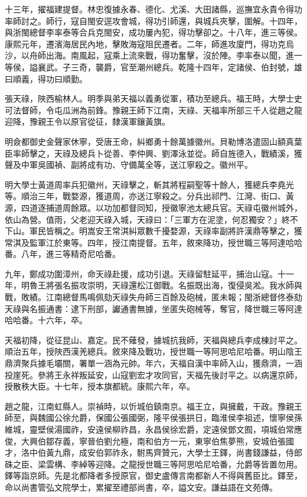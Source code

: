 \begin{pinyinscope}
十三年，擢福建提督。林忠復據永春、德化、尤溪、大田諸縣，巡撫宜永貴令得功率師討之。師行，寇自閩安逕攻會城，得功引師還，與城兵夾擊，圍解。十四年，與浙閩總督李率泰等合兵克閩安，成功屢內犯，得功擊卻之。十八年，進三等侯。康熙元年，遷濱海居民內地，擊敗海寇阻民遷者。二年，師進攻廈門，得功克烏沙，以舟師出海。南風起，寇乘上流來戰，得功奮擊，沒於陣。李率泰以聞，進一等侯，謚襄武。子三奇，襲爵，官至潮州總兵。乾隆十四年，定諸侯、伯封號，雄曰順義，得功曰順勤。

張天祿，陜西榆林人。明季與弟天福以義勇從軍，積功至總兵。福王時，大學士史可法督師，令屯瓜洲為前鋒。豫親王師下江南，天祿、天福率所部三千人從趙之龍迎降，豫親王令以原官從征，隸漢軍鑲黃旗。

明僉都御史金聲家休寧，受唐王命，糾鄉勇十餘萬據徽州。貝勒博洛遣固山額真葉臣率師擊之，天祿及總兵卜從善、李仲興、劉澤泳並從。師自旌德入，戰績溪，獲聲及中軍吳國禎、副將成有功、守備萬全等，送江寧殺之。徽州平。

明大學士黃道周率兵犯徽州，天祿擊之，斬其將程嗣聖等十餘人，獲總兵李堯光等。順治三年，戰婺源，獲道周，亦送江寧殺之。分兵出祁門、江灣、街口、黃源，四道逐捕道周餘眾。以功加都督同知，授徽寧池太總兵官。天祿屯徽州城外，依山為營。值雨，父老迎天祿入城，天祿曰：「三軍方在泥塗，何忍獨安？」終不下山。軍民皆稱之。明嵩安王常淇糾眾數千擾婺源，天祿率副將許漢鼎等擊之，獲常淇及監軍江於東等。四年，授江南提督。五年，敘來降功，授世職三等阿達哈哈番。八年，進三等精奇尼哈番。

九年，鄭成功圍漳州，命天祿赴援，成功引退。天祿留駐延平，捕治山寇。十一年，明魯王將張名振攻崇明，天祿還松江御戰。名振既出海，復侵吳淞。我水師與戰，敗績。江南總督馬鳴佩劾天祿失舟師三百餘及砲械，匿未報；閩浙總督佟泰劾天祿與名振通書：逮下刑部，讞通書無據，坐匿失砲械等，奪官，降世職三等阿達哈哈番。十六年，卒。

天福初降，從征昆山、嘉定。民不薙發，據城抗我師，天福與總兵李成棟討平之。順治五年，授陜西漢羌總兵。敘來降及戰功，授世職一等阿思哈尼哈番。明山陰王鼎濟聚兵據毛壩關，署單一涵為元帥。年六，天福自漢中率師入山，獲鼎濟，一涵投崖死。參將王永祥叛延安，山寇劉宏才攻同官，天福先後討平之。以病還京師，授散秩大臣。十七年，授本旗都統。康熙六年，卒。

趙之龍，江南虹縣人。崇禎時，以忻城伯鎮南京。福王立，與擁戴，干政。豫親王師至，與魏國公徐允爵，保國公張國弼，隆平侯張拱日，臨淮侯李祖述，懷寧侯孫維城，靈壁侯湯國祚，安遠侯柳祚昌，永昌侯徐宏爵，定遠侯鄧文囿，項城伯常應俊，大興伯鄒存義，寧晉伯劉允極，南和伯方一元，東寧伯焦夢熊，安城伯張國才，洛中伯黃九鼎，成安伯郭祚永，駙馬齊贊元，大學士王鐸，尚書錢謙益，侍郎硃之臣、梁雲構、李綽等迎降。之龍授世職三等阿思哈尼哈番，允爵等皆置勿用。鐸等詣京師。先是北都降者多授原官，御史盧傳言南都新人不得與舊臣比。鐸至，命以尚書管弘文院學士，累擢至禮部尚書，卒，謚文安。謙益語在文苑傳。


\end{pinyinscope}
